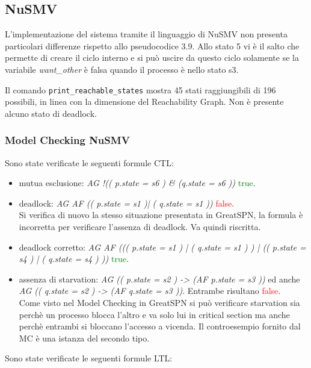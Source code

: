 \documentclass[a4paper]{article}
\begin{document}
\subsection{NuSMV}
L'implementazione del sistema tramite il linguaggio di NuSMV non presenta particolari differenze rispetto allo pseudocodice 3.9. Allo stato 5 vi è il salto che permette di creare il ciclo interno e si può uscire da questo ciclo solamente se la variabile \textit{want\_other} è falsa quando il processo è nello stato s3.

Il comando \texttt{print\_reachable\_states} mostra 45 stati raggiungibili di 196 possibili, in linea con la dimensione del Reachability Graph.
Non è presente alcuno stato di deadlock.
\newpage
\subsubsection{Model Checking NuSMV}
Sono state verificate le seguenti formule CTL:
\begin{itemize}
        \item mutua esclusione: \textit{AG !(( p.state = s6 ) \& (q.state = s6 ))} \textcolor{green}{true}.
        \item deadlock: \textit{AG AF (( p.state = s1 )| ( q.state = s1 ))} \textcolor{red}{false}.\\
		Si verifica di nuovo la stesso situazione presentata in GreatSPN, la formula è incorretta per verificare l'assenza di deadlock. Va quindi riscritta.
        \item deadlock corretto: \textit{AG AF ((( p.state = s1 ) | ( q.state = s1 ) ) | (( p.state = s4 ) | ( q.state = s4 ) ))} \textcolor{green}{true}.
        \item assenza di starvation: \textit{AG (( p.state = s2 ) -> (AF p.state = s3 ))} ed anche \textit{AG (( q.state = s2 ) -> (AF q.state = s3 ))}. Entrambe risultano \textcolor{red}{false}.\\
		Come visto nel Model Checking in GreatSPN si può verificare starvation sia perchè un processo blocca l'altro e va solo lui in critical section ma anche perchè entrambi si bloccano l'accesso a vicenda.
		Il controesempio fornito dal MC è una istanza del secondo tipo.
\end{itemize}
Sono state verificate le seguenti formule LTL:
\end{document}
